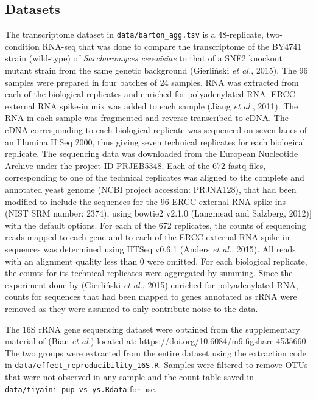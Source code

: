 \documentclass[onecolumn]{article}
\begin{document}
\hypertarget{datasets}{%
\subsection{Datasets}\label{datasets}}

The transcriptome dataset in \texttt{data/barton\_agg.tsv} is a
48-replicate, two-condition RNA-seq that was done to compare the
transcriptome of the BY4741 strain (wild-type) of
\emph{Saccharomyces cerevisiae} to that of a SNF2 knockout mutant strain
from the same genetic background (Gierliński \emph{et al.}, 2015). The
96 samples were prepared in four batches of 24 samples. RNA was
extracted from each of the biological replicates and enriched for
polyadenylated RNA. ERCC external RNA spike-in mix was added to each
sample (Jiang \emph{et al.}, 2011). The RNA in each sample was
fragmented and reverse transcribed to cDNA. The cDNA corresponding to
each biological replicate was sequenced on seven lanes of an Illumina
HiSeq 2000, thus giving seven technical replicates for each biological
replicate. The sequencing data was downloaded from the European
Nucleotide Archive under the project ID PRJEB5348. Each of the 672 fastq
files, corresponding to one of the technical replicates was aligned to
the complete and annotated yeast genome (NCBI project accession:
PRJNA128), that had been modified to include the sequences for the 96
ERCC external RNA spike-ins (NIST SRM number: 2374), using bowtie2
v2.1.0 (Langmead and Salzberg, 2012){]} with the default options. For
each of the 672 replicates, the counts of sequencing reads mapped to
each gene and to each of the ERCC external RNA spike-in sequences was
determined using HTSeq v0.6.1 (Anders \emph{et al.}, 2015). All reads
with an alignment quality less than 0 were omitted. For each biological
replicate, the counts for its technical replicates were aggregated by
summing. Since the experiment done by (Gierliński \emph{et al.}, 2015)
enriched for polyadenylated RNA, counts for sequences that had been
mapped to genes annotated as rRNA were removed as they were assumed to
only contribute noise to the data.

The 16S rRNA gene sequencing dataset were obtained from the
supplementary material of (Bian \emph{et al.}) located at:
\url{https://doi.org/10.6084/m9.figshare.4535660}. The two groups were
extracted from the entire dataset using the extraction code in
\texttt{data/effect\_reproducibility\_16S.R}. Samples were filtered to
remove OTUs that were not observed in any sample and the count table
saved in \texttt{data/tiyaini\_pup\_vs\_ys.Rdata} for use.
\end{document}
